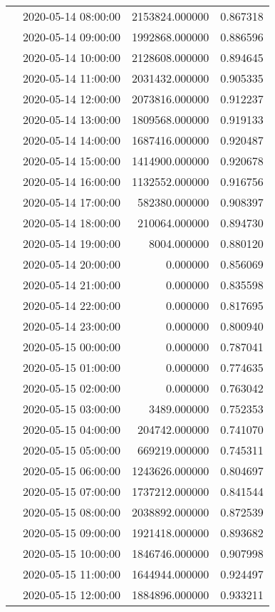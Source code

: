 \begin{tabular}{llrr}
 & 2020-05-14 08:00:00 & 2153824.000000 & 0.867318 \\
 & 2020-05-14 09:00:00 & 1992868.000000 & 0.886596 \\
 & 2020-05-14 10:00:00 & 2128608.000000 & 0.894645 \\
 & 2020-05-14 11:00:00 & 2031432.000000 & 0.905335 \\
 & 2020-05-14 12:00:00 & 2073816.000000 & 0.912237 \\
 & 2020-05-14 13:00:00 & 1809568.000000 & 0.919133 \\
 & 2020-05-14 14:00:00 & 1687416.000000 & 0.920487 \\
 & 2020-05-14 15:00:00 & 1414900.000000 & 0.920678 \\
 & 2020-05-14 16:00:00 & 1132552.000000 & 0.916756 \\
 & 2020-05-14 17:00:00 & 582380.000000 & 0.908397 \\
 & 2020-05-14 18:00:00 & 210064.000000 & 0.894730 \\
 & 2020-05-14 19:00:00 & 8004.000000 & 0.880120 \\
 & 2020-05-14 20:00:00 & 0.000000 & 0.856069 \\
 & 2020-05-14 21:00:00 & 0.000000 & 0.835598 \\
 & 2020-05-14 22:00:00 & 0.000000 & 0.817695 \\
 & 2020-05-14 23:00:00 & 0.000000 & 0.800940 \\
 & 2020-05-15 00:00:00 & 0.000000 & 0.787041 \\
 & 2020-05-15 01:00:00 & 0.000000 & 0.774635 \\
 & 2020-05-15 02:00:00 & 0.000000 & 0.763042 \\
 & 2020-05-15 03:00:00 & 3489.000000 & 0.752353 \\
 & 2020-05-15 04:00:00 & 204742.000000 & 0.741070 \\
 & 2020-05-15 05:00:00 & 669219.000000 & 0.745311 \\
 & 2020-05-15 06:00:00 & 1243626.000000 & 0.804697 \\
 & 2020-05-15 07:00:00 & 1737212.000000 & 0.841544 \\
 & 2020-05-15 08:00:00 & 2038892.000000 & 0.872539 \\
 & 2020-05-15 09:00:00 & 1921418.000000 & 0.893682 \\
 & 2020-05-15 10:00:00 & 1846746.000000 & 0.907998 \\
 & 2020-05-15 11:00:00 & 1644944.000000 & 0.924497 \\
 & 2020-05-15 12:00:00 & 1884896.000000 & 0.933211 \\

\end{tabular}
